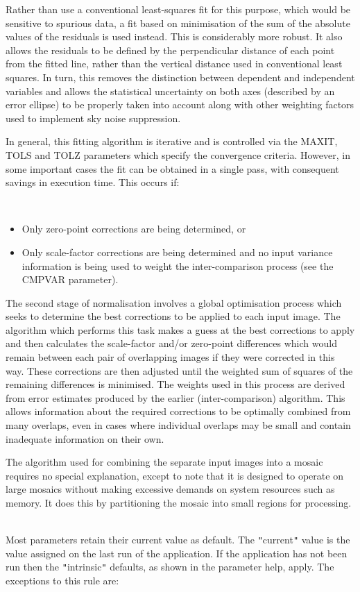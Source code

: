 \documentclass[twoside,11pt]{article}
\renewcommand{\_}{\texttt{\symbol{95}}}
\newcommand{\qt}[1]{{\tt "}#1{\tt "}}
\newcommand{\sstdiytopic}[2]{\item[#1:] \mbox{} \\[1.3ex] #2}
\newcommand{\sstitemlist}[1]{
  \mbox{} \\
  \vspace{-3.5ex}
  \begin{itemize}
     #1
  \end{itemize}
}
\newcommand{\sstitem}{\item}
\newcommand{\sstdiytopic}[2]{\item[{#1:}] #2 }
\newcommand{\sstitemlist}[1]{
      \begin{itemize}
         #1
      \end{itemize}
      \\
   }
\newcommand{\sstitem}{\item}
\begin{document}
{{      Rather than use a conventional least-squares fit for this
      purpose, which would be sensitive to spurious data, a fit based
      on minimisation of the sum of the absolute values of the
      residuals is used instead. This is considerably more robust. It
      also allows the residuals to be defined by the perpendicular
      distance of each point from the fitted line, rather than the
      vertical distance used in conventional least squares. In turn,
      this removes the distinction between dependent and independent
      variables and allows the statistical uncertainty on both axes
      (described by an error ellipse) to be properly taken into account
      along with other weighting factors used to implement sky noise
      suppression.

      In general, this fitting algorithm is iterative and is controlled
      via the MAXIT, TOLS and TOLZ parameters which specify the
      convergence criteria. However, in some important cases the fit
      can be obtained in a single pass, with consequent savings in
      execution time. This occurs if:
      \sstitemlist{

         \sstitem
            Only zero-point corrections are being determined, or

         \sstitem
            Only scale-factor corrections are being determined and no
               input variance information is being used to weight the
               inter-comparison process (see the CMPVAR parameter).

      }
      The second stage of normalisation involves a global optimisation
      process which seeks to determine the best corrections to be
      applied to each input image. The algorithm which performs this task
      makes a guess at the best corrections to apply and then
      calculates the scale-factor and/or zero-point differences which
      would remain between each pair of overlapping images if they were
      corrected in this way. These corrections are then adjusted until
      the weighted sum of squares of the remaining differences is
      minimised. The weights used in this process are derived from
      error estimates produced by the earlier (inter-comparison)
      algorithm. This allows information about the required corrections
      to be optimally combined from many overlaps, even in cases where
      individual overlaps may be small and contain inadequate
      information on their own.

      The algorithm used for combining the separate input images into a
      mosaic requires no special explanation, except to note that it is
      designed to operate on large mosaics without making excessive
      demands on system resources such as memory. It does this by
      partitioning the mosaic into small regions for processing.
   }
   \sstdiytopic{
      Behaviour of parameters
   } {
      Most parameters retain their current value as default. The
      \qt{current} value is the value assigned on the last run of the
      application. If the application has not been run then the
      \qt{intrinsic} defaults, as shown in the parameter help, apply.
      The exceptions to this rule are:
      \sstitemlist{

}}}
\end{document}

